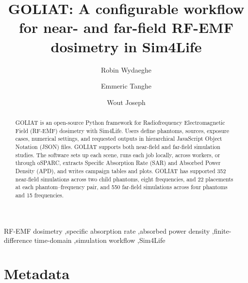 \documentclass[final,5p,times,twocolumn]{elsarticle}
\begin{document}
\renewcommand{\labelenumii}{\arabic{enumi}.\arabic{enumii}}

\begin{frontmatter}

\ifdefined\SoftwareXPublishedPreview
{}
\fi

\title{GOLIAT: A configurable workflow for near- and far-field RF-EMF dosimetry in Sim4Life}

\author[ugent]{Robin Wydaeghe}
\author[ugent]{Emmeric Tanghe}
\author[ugent]{Wout Joseph}

\address[ugent]{Department of Information Technology, Ghent University--imec, WAVES Research Group, Technologiepark-Zwijnaarde 126, 9052 Ghent, Belgium}

\begin{abstract}
GOLIAT is an open-source Python framework for Radiofrequency Electromagnetic Field (RF-EMF) dosimetry with Sim4Life. Users define phantoms, sources, exposure cases, numerical settings, and requested outputs in hierarchical JavaScript Object Notation (JSON) files. GOLIAT supports both near-field and far-field simulation studies. The software sets up each scene, runs each job locally, across workers, or through oSPARC, extracts Specific Absorption Rate (SAR) and Absorbed Power Density (APD), and writes campaign tables and plots. GOLIAT has supported 352 near-field simulations across two child phantoms, eight frequencies, and 22 placements at each phantom--frequency pair, and 550 far-field simulations across four phantoms and 15 frequencies.
\end{abstract}

\begin{keyword}
RF-EMF dosimetry \sep specific absorption rate \sep absorbed power density \sep finite-difference time-domain \sep simulation workflow \sep Sim4Life
\end{keyword}

\end{frontmatter}

\ifdefined\SoftwareXPublishedPreview
\else
\clearpage
\section*{Metadata}
\fi
\end{document}
